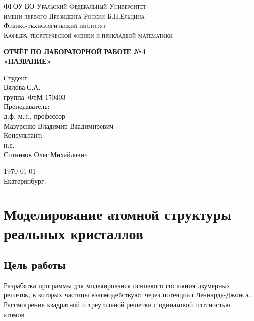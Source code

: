 \documentclass[14pt,a4paper,report]{ncc}
\begin{document}
\def\contentsname{Содержание}

\begin{titlepage}
\begin{center}
\textsc{ФГОУ ВО Уральский Федеральный Университет \\ имени первого Президента России Б.Н.Ельцина\\[5mm]
Физико-технологический институт\\[2mm]
Кафедра теоретической физики и прикладной математики}

\vfill

\textbf{ОТЧЁТ ПО ЛАБОРАТОРНОЙ РАБОТЕ №4\\[3mm]
«НАЗВАНИЕ»\\[6mm]
}
\end{center}

\hfill
\begin{minipage}{.5\textwidth}
Студент:\\[2mm] 
Вялова С.А.\\
группа: ФтМ-170403 \\[5mm]

Преподаватель:\\[2mm] 
д.ф.-м.н., профессор\\
Мазуренко Владимир Владимирович\\[5mm]

Консультант:\\[2mm] 
н.с.\\
Сотников Олег Михайлович\\

\end{minipage}%
\vfill
\begin{center}
\today  \\
 Екатеринбург.
\end{center}
\end{titlepage}

\tableofcontents
\newpage
\chapter{Моделирование атомной структуры реальных кристаллов}
\section{Цель работы}


Разработка программы для моделирования основного состояния двумерных решеток, в которых частицы взаимодействуют через потенциал Леннарда-Джонса. Рассмотрение квадратной и треугольной решетки с одинаковой плотностью атомов.
\
\end{document}
